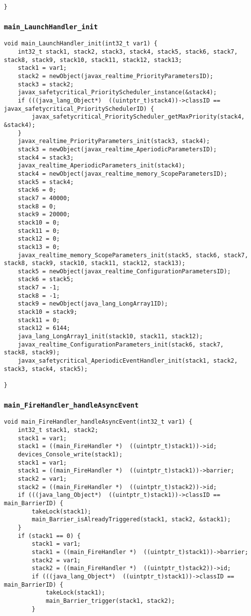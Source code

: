 \begin{landscape}
\begin{multicols}{2}
\begin{lstlisting}[firstnumber=2437]
}
\end{lstlisting}

\subsubsection{\texttt{main\_LaunchHandler\_init}}

\begin{lstlisting}[firstnumber=2612]
void main_LaunchHandler_init(int32_t var1) {
	int32_t stack1, stack2, stack3, stack4, stack5, stack6, stack7, stack8, stack9, stack10, stack11, stack12, stack13;
	stack1 = var1;
	stack2 = newObject(javax_realtime_PriorityParametersID);
	stack3 = stack2;
	javax_safetycritical_PriorityScheduler_instance(&stack4);
	if (((java_lang_Object*)  ((uintptr_t)stack4))->classID == javax_safetycritical_PrioritySchedulerID) {
		javax_safetycritical_PriorityScheduler_getMaxPriority(stack4, &stack4);
	}
	javax_realtime_PriorityParameters_init(stack3, stack4);
	stack3 = newObject(javax_realtime_AperiodicParametersID);
	stack4 = stack3;
	javax_realtime_AperiodicParameters_init(stack4);
	stack4 = newObject(javax_realtime_memory_ScopeParametersID);
	stack5 = stack4;
	stack6 = 0;
	stack7 = 40000;
	stack8 = 0;
	stack9 = 20000;
	stack10 = 0;
	stack11 = 0;
	stack12 = 0;
	stack13 = 0;
	javax_realtime_memory_ScopeParameters_init(stack5, stack6, stack7, stack8, stack9, stack10, stack11, stack12, stack13);
	stack5 = newObject(javax_realtime_ConfigurationParametersID);
	stack6 = stack5;
	stack7 = -1;
	stack8 = -1;
	stack9 = newObject(java_lang_LongArray1ID);
	stack10 = stack9;
	stack11 = 0;
	stack12 = 6144;
	java_lang_LongArray1_init(stack10, stack11, stack12);
	javax_realtime_ConfigurationParameters_init(stack6, stack7, stack8, stack9);
	javax_safetycritical_AperiodicEventHandler_init(stack1, stack2, stack3, stack4, stack5);

}
\end{lstlisting}

\subsubsection{\texttt{main\_FireHandler\_handleAsyncEvent}}

\begin{lstlisting}[firstnumber=2759]
void main_FireHandler_handleAsyncEvent(int32_t var1) {
	int32_t stack1, stack2;
	stack1 = var1;
	stack1 = ((main_FireHandler *)  ((uintptr_t)stack1))->id;
	devices_Console_write(stack1);
	stack1 = var1;
	stack1 = ((main_FireHandler *)  ((uintptr_t)stack1))->barrier;
	stack2 = var1;
	stack2 = ((main_FireHandler *)  ((uintptr_t)stack2))->id;
	if (((java_lang_Object*)  ((uintptr_t)stack1))->classID == main_BarrierID) {
		takeLock(stack1);
		main_Barrier_isAlreadyTriggered(stack1, stack2, &stack1);
	}
	if (stack1 == 0) {
		stack1 = var1;
		stack1 = ((main_FireHandler *)  ((uintptr_t)stack1))->barrier;
		stack2 = var1;
		stack2 = ((main_FireHandler *)  ((uintptr_t)stack2))->id;
		if (((java_lang_Object*)  ((uintptr_t)stack1))->classID == main_BarrierID) {
			takeLock(stack1);
			main_Barrier_trigger(stack1, stack2);
		}


\end{lstlisting}
\end{multicols}
\end{landscape}
